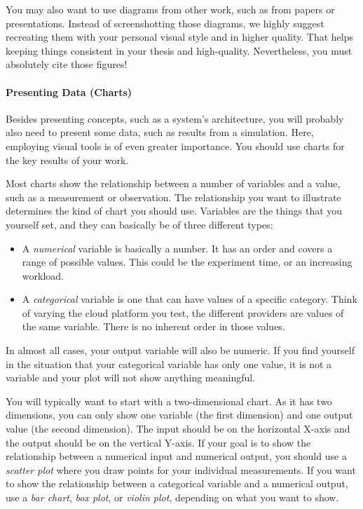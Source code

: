 \documentclass[a4]{article}
\begin{document}
You may also want to use diagrams from other work, such as from papers or presentations.
Instead of screenshotting those diagrams, we highly suggest recreating them with your personal visual style and in higher quality.
That helps keeping things consistent in your thesis and high-quality.
Nevertheless, you must absolutely cite those figures!

\paragraph{Presenting Data (Charts)}

Besides presenting concepts, such as a system's architecture, you will probably also need to present some data, such as results from a simulation.
Here, employing visual tools is of even greater importance.
You should use charts for the key results of your work.

Most charts show the relationship between a number of variables and a value, such as a measurement or observation.
The relationship you want to illustrate determines the kind of chart you should use.
Variables are the things that you yourself set, and they can basically be of three different types:

\begin{itemize}
    \item A \emph{numerical} variable is basically a number. It has an order and covers a range of possible values. This could be the experiment time, or an increasing workload.
    \item A \emph{categorical} variable is one that can have values of a specific category. Think of varying the cloud platform you test, the different providers are values of the same variable. There is no inherent order in those values.
\end{itemize}

In almost all cases, your output variable will also be numeric.
If you find yourself in the situation that your categorical variable has only one value, it is not a variable and your plot will not show anything meaningful.

You will typically want to start with a two-dimensional chart.
As it has two dimensions, you can only show one variable (the first dimension) and one output value (the second dimension).
The input should be on the horizontal X-axis and the output should be on the vertical Y-axis.
If your goal is to show the relationship between a numerical input and numerical output, you should use a \emph{scatter plot} where you draw points for your individual measurements.
If you want to show the relationship between a categorical variable and a numerical output, use a \emph{bar chart}, \emph{box plot}, or \emph{violin plot}, depending on what you want to show.
\end{document}
